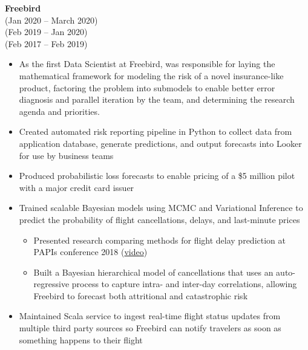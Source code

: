 \documentclass{res}
\begin{document}
\begin{resume}
    {\bf Freebird} \\ 
   \hspace{3pt} (Jan 2020 -- March 2020) \\
   \hspace{17pt} (Feb 2019 -- Jan 2020) \\
   \hspace{49pt} (Feb 2017 -- Feb 2019)
  \vspace{2pt}
  \begin{itemize} \itemsep 2.0pt \parskip 2.0pt %
    \item As the first Data Scientist at Freebird, was responsible for laying the mathematical framework for modeling the risk of a novel insurance-like product, factoring the problem into submodels to enable better error diagnosis and parallel iteration by the team, and determining the research agenda and priorities.
    \item Created automated risk reporting pipeline in Python to collect data from application database, generate predictions, and output forecasts into Looker for use by business teams
    \item Produced probabilistic loss forecasts to enable pricing of a \$5 million pilot with a major credit card issuer
    \item Trained scalable Bayesian models using MCMC and Variational Inference to predict the probability of flight cancellations, delays, and last-minute prices
    \setlength{\parskip}{-2pt} 
    \begin{itemize}
      \setlength{\itemsep}{1.0pt}
    \item Presented research comparing methods for flight delay prediction at PAPIs conference 2018 (\href{https://www.infoq.com/presentations/flight-bayesian-prediction}{video})
    \item Built a Bayesian hierarchical model of cancellations that uses an auto-regressive process to capture intra- and inter-day correlations, allowing Freebird to forecast both attritional and catastrophic risk
    \end{itemize}
    \setlength{\parskip}{2.0pt} 
  \item Maintained Scala service to ingest real-time flight status updates from multiple third party sources so Freebird can notify travelers as soon as something happens to their flight
  \end{itemize}


\end{resume}
\end{document}
